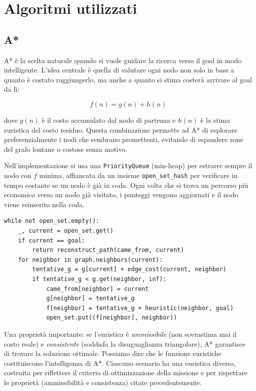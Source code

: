 \documentclass[11pt,a4paper]{article}
\begin{document}
\section{Algoritmi utilizzati}

\subsection{A*}

A* è la scelta naturale quando si vuole guidare la ricerca verso il goal in modo intelligente. L'idea centrale è quella di valutare ogni nodo non solo in base a quanto è costato raggiungerlo, ma anche a quanto si stima costerà arrivare al goal da lì:

\[
  f(n) = g(n) + h(n)
\]

dove $g(n)$ è il costo accumulato dal nodo di partenza e $h(n)$ è la stima euristica del costo residuo. Questa combinazione permette ad A* di esplorare preferenzialmente i nodi che sembrano promettenti, evitando di espandere zone del grafo lontane o costose senza motivo.

Nell'implementazione si usa una \texttt{PriorityQueue} (min-heap) per estrarre sempre il nodo con $f$ minima, affiancata da un insieme \texttt{open\_set\_hash} per verificare in tempo costante se un nodo è già in coda. Ogni volta che si trova un percorso più economico verso un nodo già visitato, i punteggi vengono aggiornati e il nodo viene reinserito nella coda.

\begin{lstlisting}[caption={Nucleo del loop A*}]
while not open_set.empty():
    _, current = open_set.get()
    if current == goal:
        return reconstruct_path(came_from, current)
    for neighbor in graph.neighbors(current):
        tentative_g = g[current] + edge_cost(current, neighbor)
        if tentative_g < g.get(neighbor, inf):
            came_from[neighbor] = current
            g[neighbor] = tentative_g
            f[neighbor] = tentative_g + heuristic(neighbor, goal)
            open_set.put((f[neighbor], neighbor))
\end{lstlisting}

Una proprietà importante: se l'euristica è \emph{ammissibile} (non sovrastima mai il costo reale) e \emph{consistente} (soddisfa la disuguaglianza triangolare), A* garantisce di trovare la soluzione ottimale.
Possiamo dire che le funzione euristiche costituiscono l'intelligenza di A*. Ciascuno scenario ha una euristica diversa, costruita per riflettere il criterio di ottimizzazione della missione e per rispettare le proprietà (ammissibilità e consistenza) citate precedentemente.
\end{document}
